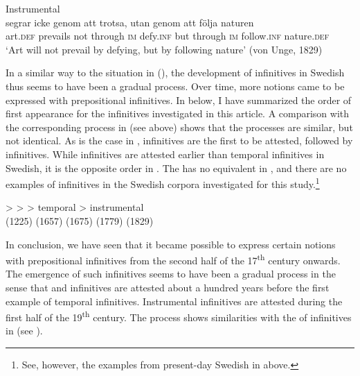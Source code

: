 \documentclass[output=paper]{langscibook}
\begin{document}
\ex Instrumental\label{ex:kalm:13b}\\
 segrar icke genom att trotsa, utan genom att följa naturen\\
art.\textsc{def} prevails not through \textsc{im} defy.\textsc{inf} but through \textsc{im} follow.\textsc{inf} nature.\textsc{def}\\
\glt ‘Art will not prevail by defying, but by following nature’ (von Unge, 1829)
\z 
\z 


In a similar way to the situation in  (\citealt{Schulte2007Prepositional,Schulte2007What}), the development of  infinitives in Swedish thus seems to have been a gradual process. Over time, more  notions came to be expressed with prepositional infinitives. In  below, I have summarized the order of first appearance for the  infinitives investigated in this article. A comparison with the corresponding process in  (see  above) shows that the processes are similar, but not identical. As is the case in ,  infinitives are the first to be attested, followed by  infinitives. While  infinitives are attested earlier than temporal infinitives in Swedish, it is the opposite order in . The  has no equivalent in , and there are no examples of  infinitives in the Swedish corpora investigated for this study.\footnote{See, however, the examples from present-day Swedish in  above.}     

\ea  \label{ex:kalm:14}
\gll {} >    >  > temporal > instrumental\\
(1225) {} (1657) {} (1675) {} (1779) {} (1829)\\
\z 



In conclusion, we have seen that it became possible to express certain  notions with prepositional infinitives from the second half of the 17\textsuperscript{th} century onwards. The emergence of such  infinitives seems to have been a gradual process in the sense that  and  infinitives are attested about a hundred years before the first example of temporal infinitives. Instrumental infinitives are attested during the first half of the 19\textsuperscript{th} century. The process shows similarities with the  of  infinitives in  (see \citealt{Schulte2007Prepositional,Schulte2007What}). 
\end{document}
